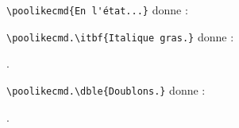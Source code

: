 \documentclass[varwidth, border = 3pt]{standalone}
\begin{document}
\verb#\poolikecmd{En l'état...}# donne :



\medskip


\verb#\poolikecmd.\itbf{Italique gras.}# donne :

\poolikecmd.


\medskip


\verb#\poolikecmd.\dble{Doublons.}# donne :

\poolikecmd.
\end{document}

